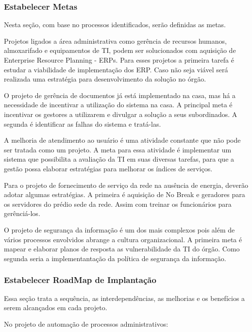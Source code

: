 \subsubsection{Estabelecer Metas} \label{subsec:projetos}

Nesta seção, com base no processos identificados, serão definidas as metas.

Projetos ligados a área administrativa como gerência de recursos humanos, almoxarifado e equipamentos de TI, podem ser solucionados com aquisição de Enterprise Resource Planning - ERPs. Para esses projetos a primeira tarefa é estudar a viabilidade de implementação dos ERP. Caso não seja viável será realizada uma estratégia para desenvolvimento da solução no órgão.

O projeto de gerência de documentos já está implementado na casa, mas há a necessidade de incentivar a utilização do sistema na casa. A principal meta é incentivar os gestores a utilizarem e divulgar a solução a seus subordinados. A segunda é identificar as falhas do sistema e tratá-las.
 
A melhoria de atendimento ao usuário é uma atividade constante que não pode ser tratada como um projeto. A meta para essa atividade é implementar um sistema que possibilita a avaliação da TI em suas diversas tarefas, para que a gestão possa elaborar estratégias para melhorar os índices de serviços. 

Para o projeto de fornecimento de serviço da rede na ausência de energia, deverão adotar algumas estratégias. A primeira é aquisição de No Break e geradores para os servidores do prédio sede da rede. Assim com treinar os funcionários para gerênciá-los. 

O projeto de segurança da informação é um dos mais complexos pois além de vários processos envolvidos abrange a cultura organizacional. A primeira meta é mapear e elaborar planos de resposta as vulnerabilidade da TI do órgão. Como segunda seria a implementantação da política de segurança da informação.

\subsubsection{Estabelecer RoadMap de Implantação}

Essa seção trata a sequência, as interdependências, as melhorias e os benefícios a serem alcançados em cada projeto.

No projeto de automação de processos administrativos:

